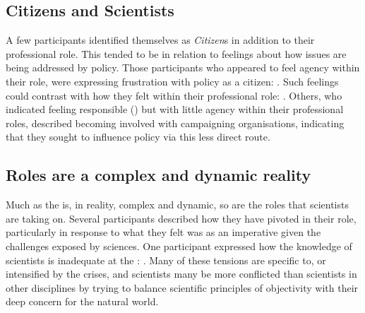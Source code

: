 
\subsection{Citizens and Scientists}

A few participants identified themselves as \emph{Citizen}s in addition to their professional role. This tended to be in relation to feelings about how \CAN{} issues are being addressed by policy. Those participants who appeared to feel agency within their role, were expressing frustration with policy as a citizen: . Such feelings could contrast with how they felt within their professional role: . Others, who indicated feeling responsible () but with little agency within their professional roles, described becoming involved with campaigning organisations, indicating that they sought to influence policy via this less direct route.

\subsection{Roles are a complex and dynamic reality}

Much as the \SPI{} is, in reality, complex and dynamic, so are the roles that scientists are taking on. Several participants described how they have pivoted in their role, particularly in response to what they felt was as an imperative given the challenges exposed by \CAN{} sciences. %
One participant expressed how the knowledge of scientists is inadequate at the \CAN{} \SPI: . Many of these tensions are specific to, or intensified by the \CAN{} crises, and \CAN{} scientists many be more conflicted than scientists in other disciplines by trying to balance scientific principles of objectivity with their deep concern for the natural world.

